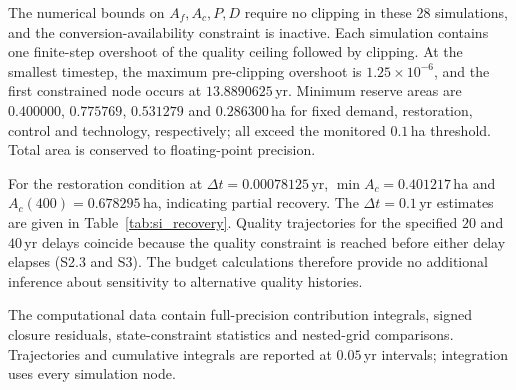 \documentclass[11pt,a4paper]{article}
\begin{document}
The numerical bounds on $A_f,A_c,P,D$ require no clipping in these 28 simulations, and the conversion-availability constraint is inactive. Each simulation contains one finite-step overshoot of the quality ceiling followed by clipping. At the smallest timestep, the maximum pre-clipping overshoot is $1.25\times10^{-6}$, and the first constrained node occurs at $13.8890625$\,yr. Minimum reserve areas are $0.400000$, $0.775769$, $0.531279$ and $0.286300$\,ha for fixed demand, restoration, control and technology, respectively; all exceed the monitored $0.1$\,ha threshold. Total area is conserved to floating-point precision.

For the restoration condition at $\Delta t=0.00078125$\,yr, $\min A_c=0.401217$\,ha and $A_c(400)=0.678295$\,ha, indicating partial recovery. The $\Delta t=0.1$\,yr estimates are given in Table~\ref{tab:si_recovery}. Quality trajectories for the specified $20$ and $40$\,yr delays coincide because the quality constraint is reached before either delay elapses (S2.3 and S3). The budget calculations therefore provide no additional inference about sensitivity to alternative quality histories.

The computational data contain full-precision contribution integrals, signed closure residuals, state-constraint statistics and nested-grid comparisons. Trajectories and cumulative integrals are reported at $0.05$\,yr intervals; integration uses every simulation node.
\end{document}
